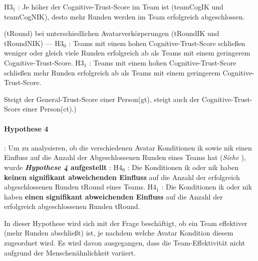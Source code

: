 \documentclass[a4paper,11pt]{article}%
\renewcommand{\\}{\vspace*{0.5\baselineskip} \newline}
\begin{document}
H3$_{1}$ : Je höher der Cognitive-Trust-Score im Team ist (\ac{teamCogIK} und \ac{teamCogNIK}), desto mehr Runden werden im Team erfolgreich abgeschlossen.

 (\ac{tRound}) bei unterschiedlichen Avatarverkörperungen (\ac{tRoundIK} und \ac{tRoundNIK})
 ---
H3$_{0}$ : Teams mit einem hohen Cognitive-Trust-Score schließen weniger oder gleich viele Runden erfolgreich ab als Teams mit einem geringerem Cognitive-Trust-Score.
H3$_{1}$ : Teams mit einem hohen Cognitive-Trust-Score schließen mehr Runden erfolgreich ab als Teams mit einem geringerem Cognitive-Trust-Score.
	
Steigt der General-Trust-Score einer Person(\ac{gt}), steigt auch der Cognitive-Trust-Score einer Person(\ac{ct}).)	
\paragraph{Hypothese 4}:
Um zu analysieren, ob die verschiedenen Avatar Konditionen \ac{ik} sowie \ac{nik} einen Einfluss auf die Anzahl der Abgeschlossenen Runden eines Teams hat (\textit{Siehe }), wurde \textbf{\textit{Hypothese 4} aufgestellt} :\\
	H4$_{0}$ : Die Konditionen \ac{ik} oder \ac{nik} haben \textbf{keinen signifikant abweichenden Einfluss} auf die Anzahl der erfolgreich abgeschlossenen Runden \ac{tRound} eines Teams.\newline
	H4$_{1}$ : Die Konditionen \ac{ik} oder \ac{nik} haben \textbf{einen signifikant abweichenden Einfluss} auf die Anzahl der erfolgreich abgeschlossenen Runden \ac{tRound}.

In dieser Hypothese wird sich mit der Frage beschäftigt, ob ein Team effektiver (mehr Runden abschließt) ist, je nachdem welche Avatar Kondition diesem zugeordnet wird. Es wird davon ausgegangen, dass die Team-Effektivität nicht aufgrund der Menschenähnlichkeit variiert.
\end{document}
